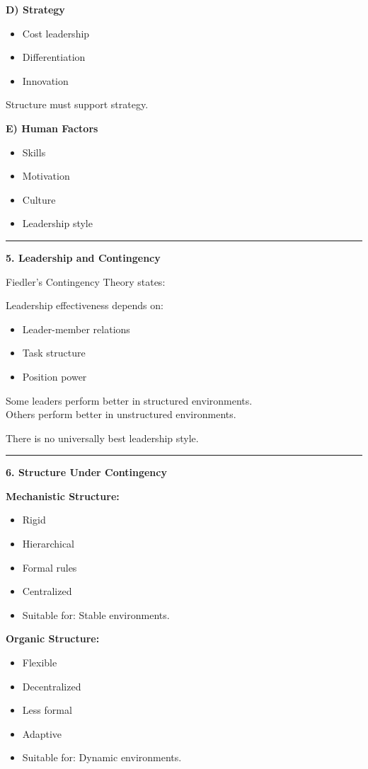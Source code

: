 \documentclass[10pt,a4paper]{article}
\newcommand{\separator}{\vspace{0.4em}\noindent\rule{\linewidth}{0.6pt}\vspace{0.4em}}
\begin{document}
\textbf{D) Strategy}
\begin{itemize}
  \item Cost leadership
  \item Differentiation
  \item Innovation
\end{itemize}

Structure must support strategy.

\textbf{E) Human Factors}
\begin{itemize}
  \item Skills
  \item Motivation
  \item Culture
  \item Leadership style
\end{itemize}

\separator

\textbf{5. Leadership and Contingency}

Fiedler's Contingency Theory states:

Leadership effectiveness depends on:
\begin{itemize}
  \item Leader-member relations
  \item Task structure
  \item Position power
\end{itemize}

Some leaders perform better in structured environments.\\
Others perform better in unstructured environments.

There is no universally best leadership style.

\separator

\textbf{6. Structure Under Contingency}

\textbf{Mechanistic Structure:}
\begin{itemize}
  \item Rigid
  \item Hierarchical
  \item Formal rules
  \item Centralized
  \item Suitable for: Stable environments.
\end{itemize}

\textbf{Organic Structure:}
\begin{itemize}
  \item Flexible
  \item Decentralized
  \item Less formal
  \item Adaptive
  \item Suitable for: Dynamic environments.
\end{itemize}
\end{document}
